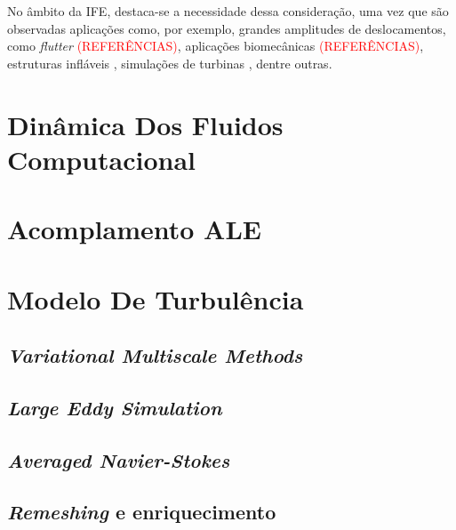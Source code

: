 \documentclass[_ArquivoPrincipal.tex]{subfiles}
\begin{document}
No âmbito da IFE, destaca-se a necessidade dessa consideração, uma vez que são observadas aplicações como, por exemplo, grandes amplitudes de deslocamentos, como \textit{flutter} \textcolor{red}{(REFERÊNCIAS)}, aplicações biomecânicas \textcolor{red}{(REFERÊNCIAS)}, estruturas infláveis \cite{karagiozis2011computational}, simulações de turbinas \cite{bazilevs20113d}, dentre outras.

\section{Dinâmica Dos Fluidos Computacional} \label{DFC}

\section{Acomplamento ALE} \label{ALE}

\section{Modelo De Turbulência} \label{MT}

\subsection{\textit{Variational Multiscale Methods}} \label{VMS}

\subsection{\textit{Large Eddy Simulation}} \label{LES}

\subsection{\textit{Averaged Navier-Stokes}} \label{ANS}

\subsection{\textit{Remeshing} e enriquecimento} \label{ReE}
\end{document}
